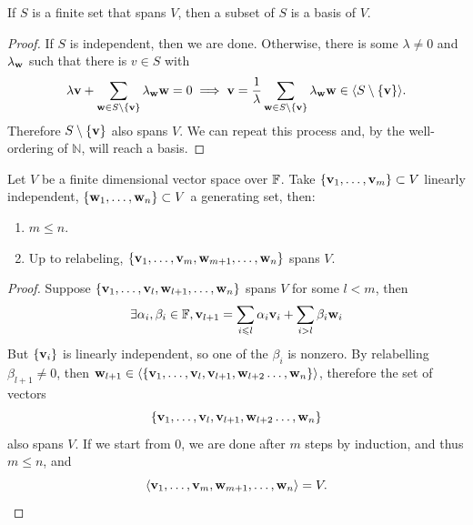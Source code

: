 \documentclass[a4paper]{article}
\begin{document}
\begin{lemma}
    If $S$ is a finite set that spans $V$, then a subset of $S$ is a basis of $V$.
\end{lemma}
\begin{proof}
    If $S$ is independent, then we are done.
    Otherwise, there is some $\lambda\neq 0$ and $\lambda_{\bf w}$ such that there is $v\in S$ with
    $$\lambda {\bf v}+\sum_{{\bf w}\in S\setminus\{{\bf v}\}}\lambda_{\bf w}{\bf w}=0\implies {\bf v}=\frac{1}{\lambda}\sum_{{\bf w}\in S\setminus\{{\bf v}\}}\lambda_{\bf w}{\bf w}\in\langle S\setminus\{{\bf v}\}\rangle.$$
    Therefore $S\setminus\{{\bf v}\}$ also spans $V$.
    We can repeat this process and, by the well-ordering of $\mathbb N$, will reach a basis.
\end{proof}
\begin{theorem}\label{thm:steinitz}
    Let $V$ be a finite dimensional vector space over ${\mathbb{F}}$. Take $\{{\bf v}_1,\ldots,{\bf v}_m\}\subset V$ linearly independent, $\{{\bf w}_1,\ldots,{\bf w}_n\}\subset V$ a generating set, then:
    \begin{enumerate}
        \item $m\le n$.
        \item Up to relabeling, $\{{\bf v}_1,\ldots,{\bf v}_m,{\bf w}_{m+1},\ldots,{\bf w}_n\}$ spans $V$.
    \end{enumerate}
\end{theorem}
\begin{proof}
    Suppose $\{{\bf v}_1,\ldots,{\bf v}_l,{\bf w}_{l+1},\ldots,{\bf w}_n\}$ spans $V$ for some $l<m$, then
    $$\exists\alpha_i,\beta_i\in {\mathbb{F}}, {\bf v}_{l+1}=\sum_{i\leqslant l}\alpha_i{\bf v}_i+\sum_{i>l}\beta_i{\bf w}_i$$
    But $\{{\bf v}_i\}$ is linearly independent, so one of the $\beta_i$ is nonzero.
    By relabelling $\beta_{l+1}\neq 0$, then ${\bf w}_{l+1}\in\langle\{{\bf v}_1,\ldots,{\bf v}_l,{\bf v}_{l+1},{\bf w}_{l+2}\ldots,{\bf w}_n\}\rangle$, therefore the set of vectors 
    \[
        \{{\bf v}_1,\ldots,{\bf v}_l,{\bf v}_{l+1},{\bf w}_{l+2}\ldots,{\bf w}_n\}
    \]
    also spans $V$. If we start from 0, we are done after $m$ steps by induction, and thus $m\le n$, and
    \[
        \langle {\bf v}_1,\ldots,{\bf v}_m,{\bf w}_{m+1},\ldots,{\bf w}_n \rangle =V.\qedhere
    \]
\end{proof}
\end{document}
